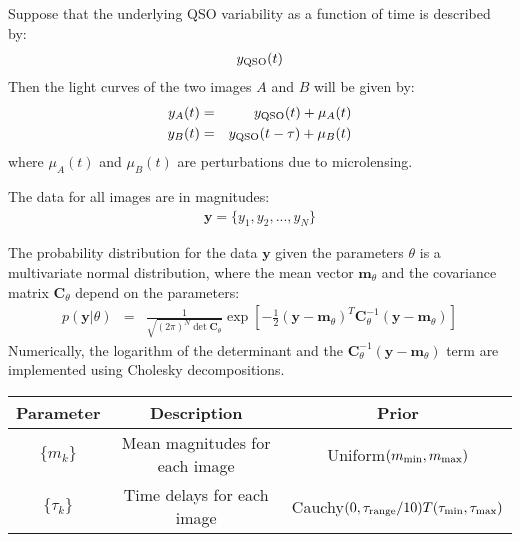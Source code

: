 \documentclass[a4paper, 11pt]{article}
\title{}
\author{}
\date{} %
\newcommand{\yy}{\mathbf{y}}
\newcommand{\mm}{\mathbf{m}_\theta}
\newcommand{\CC}{\mathbf{C}_\theta}
\begin{document}
Suppose that the underlying QSO variability as a function of time is
described by:
\begin{eqnarray}
y_{\rm QSO}(t)
\end{eqnarray}
Then the light curves of the two images $A$ and $B$ will be given by:
\begin{eqnarray}
y_A(t) &=& y_{\rm QSO}(t) + \mu_A(t)\\
y_B(t) &=& y_{\rm QSO}(t - \tau) + \mu_B(t)
\end{eqnarray}
where $\mu_A(t)$ and $\mu_B(t)$ are perturbations due to microlensing.


The data for all images are in magnitudes:
\begin{eqnarray}
\yy = \{y_1, y_2, ..., y_N\}
\end{eqnarray}


The probability distribution for the data $\yy$ given the parameters
$\theta$
is a multivariate normal distribution, where the mean vector $\mm$
and the covariance matrix $\CC$ depend on the parameters:
\begin{eqnarray}
p(\yy | \theta) &=& \frac{1}{\sqrt{(2\pi)^N\det{\CC}}}
\exp\left[
-\frac{1}{2}
\left(
\yy - \mm
\right)^T
\CC^{-1}
\left(
\yy - \mm
\right)
\right]
\end{eqnarray}
Numerically, the logarithm of the determinant and the
$\CC^{-1}\left(\yy - \mm\right)$ term are implemented using
Cholesky decompositions.

\begin{table}[h!]
\begin{center}
\begin{tabular}{|c|c|c|}
\hline
Parameter & Description & Prior\\
\hline
$\{m_k\}$ & Mean magnitudes for each image & Uniform$(m_{\rm min}, m_{\rm max})$\\
$\{\tau_k\}$ & Time delays for each image & Cauchy$(0, \tau_{\rm range}/10)T(\tau_{\rm min}, \tau_{\rm max})$\\
\end{tabular}
\end{center}
\end{table}
\end{document}
